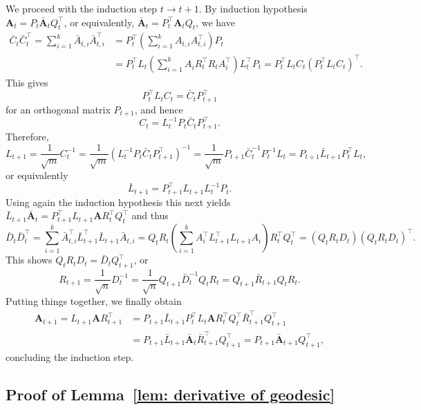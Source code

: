 \documentclass[a4paper]{article}
\newcommand{\bA}{\mathbf{A}}
\theoremstyle{definition}
\numberwithin{equation}{section}
\begin{document}
We proceed with the induction step $t \to t+1$. By induction hypothesis $\bA_t = P_t^{} \bar{\bA}_t^{} Q_t^\top$, or equivalently, $\bar{\bA}_t = P_t^\top \bA_t^{} Q_t$, we have
\begin{align*}
 \bar C_t^{} \bar C_t^{\top} 
 = \sum_{i=1}^k \bar A_{t,i}^{} \bar A_{t,i}^\top 
 &= P_t^{\top} \left( \sum_{i=1}^k A_{t,i}^{} A_{t,i}^\top \right) P_t^{} \\
 &= P_t^{\top} L_t^{} \left( \sum_{i=1}^k A_{i}^{} R_t^\top R_t^{} A_{i}^\top \right) L_t^\top P_t^{} 
 = P_t^{\top} L_t^{} C_t^{} (P_t^{\top} L_t^{} C_t^{})^\top.
\end{align*}
This gives
\[
 P_t^{\top} L_t^{} C_t^{} = \bar C_t^{} P_{t+1}^\top
\]
for an orthogonal matrix $P_{t+1}$, and hence
\[
 C_t^{} = L_{t}^{-1} P_t \bar C_t^{} P_{t+1}^\top.
\]
Therefore,
\[
 L_{t+1} 
 = \frac{1}{\sqrt{m}} C_t^{-1} 
 = \frac{1}{\sqrt{m}} (L_{t}^{-1} P_t \bar C_t^{} P_{t+1}^\top)^{-1} 
 = \frac{1}{\sqrt{m}} P_{t+1}^{} \bar C_t^{-1} P_t^{-1} L_t 
 = P_{t+1}^{} \bar L_{t+1} P_t^{\top} L_t,
\]
or equivalently
\[
 \bar L_{t+1} = P_{t+1}^\top L_{t+1} L_t^{-1} P_{t}^{}.
\]
Using again the induction hypothesis this next yields $\bar L_{t+1} \bar{\bA}_t = P_{t+1}^\top L_{t+1}^{} \bA R_t^\top Q_t^\top$ and thus
\[
 \bar D_t^{} \bar D_t^\top = \sum_{i=1}^k \bar A_{t,i}^\top \bar L_{t+1}^\top \bar L_{t+1}^{} \bar A_{t,i} = Q_t R_t \left(\sum_{i=1}^k A_i^\top L_{t+1}^\top L_{t+1}^{} A_i^{} \right) R_t^\top Q_t^\top = (Q_t^{} R_t^{} D_t^{}) (Q_t^{} R_t^{} D_t^{})^\top.
\]
This shows $Q_t^{} R_t^{} D_t^{} = \bar D_t^{} Q_{t+1}^\top$, or
\[
 R_{t+1} = \frac{1}{\sqrt{n}} D_t^{-1} = \frac{1}{\sqrt{n}} Q_{t+1}^{} \bar D_t^{-1} Q_t R_t
 = Q_{t+1}^{} \bar R_{t+1}^{} Q_t R_t.
\]
Putting things together, we finally obtain
\begin{align*}
 \bA_{t+1} 
 = L_{t+1} \bA R_{t+1}^\top 
 &= P_{t+1} \bar L_{t+1} P_t^{\top} L_t \bA R_t^\top Q_t^\top \bar R_{t+1}^\top Q_{t+1}^\top \\ 
 &= P_{t+1} \bar L_{t+1} \bar{\bA}_t \bar R_{t+1}^\top Q_{t+1}^\top = P_{t+1} \bar{\bA}_{t+1} Q_{t+1}^\top,
\end{align*}
concluding the induction step.\hfill  

\subsection{Proof of Lemma~\ref{lem: derivative of geodesic}}\label{sec: proof lemma}
\end{document}
